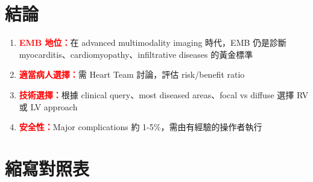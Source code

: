 \documentclass[12pt,a4paper]{article}
\begin{document}
\section{結論}

\begin{enumerate}
    \item \textcolor{red}{\textbf{EMB 地位：}}在 advanced multimodality imaging 時代，EMB 仍是診斷 myocarditis、cardiomyopathy、infiltrative diseases 的黃金標準
    \item \textcolor{red}{\textbf{適當病人選擇：}}需 Heart Team 討論，評估 risk/benefit ratio
    \item \textcolor{red}{\textbf{技術選擇：}}根據 clinical query、most diseased areas、focal vs diffuse 選擇 RV 或 LV approach
    \item \textcolor{red}{\textbf{安全性：}}Major complications 約 1-5\%，需由有經驗的操作者執行
\end{enumerate}

\section{縮寫對照表}
\end{document}
